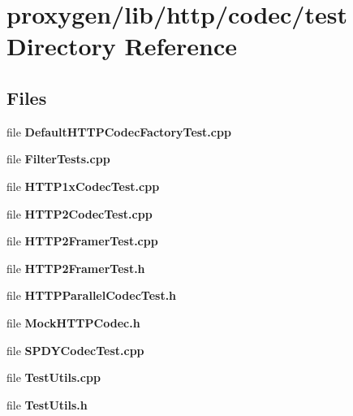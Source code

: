 \section{proxygen/lib/http/codec/test Directory Reference}
\label{dir_654fdf097ab1437adff980cb82412985}
\subsection*{Files}
\begin{DoxyCompactItemize}
\item 
file {\bf Default\+H\+T\+T\+P\+Codec\+Factory\+Test.\+cpp}
\item 
file {\bf Filter\+Tests.\+cpp}
\item 
file {\bf H\+T\+T\+P1x\+Codec\+Test.\+cpp}
\item 
file {\bf H\+T\+T\+P2\+Codec\+Test.\+cpp}
\item 
file {\bf H\+T\+T\+P2\+Framer\+Test.\+cpp}
\item 
file {\bf H\+T\+T\+P2\+Framer\+Test.\+h}
\item 
file {\bf H\+T\+T\+P\+Parallel\+Codec\+Test.\+h}
\item 
file {\bf Mock\+H\+T\+T\+P\+Codec.\+h}
\item 
file {\bf S\+P\+D\+Y\+Codec\+Test.\+cpp}
\item 
file {\bf Test\+Utils.\+cpp}
\item 
file {\bf Test\+Utils.\+h}
\end{DoxyCompactItemize}
